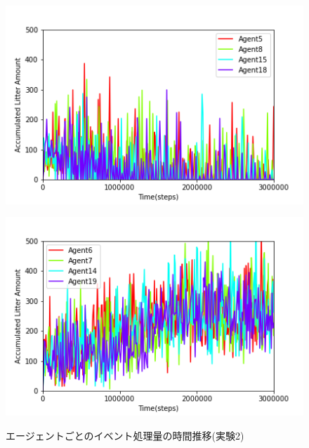 \documentclass[12pt,a4j,twoside]{jarticle}
\begin{document}
\begin{figure}[t]
      \begin{minipage}[t]{0.48\columnwidth}
        \centering
        \includegraphics[keepaspectratio, width=\linewidth]{figures/al_graph_ER_Complex_top.png}\\
        \label{fig:al_ER_Complex_top}
      \end{minipage}
    \hfill
      \begin{minipage}[t]{0.48\columnwidth}
        \centering
        \includegraphics[keepaspectratio, width=\linewidth]{figures/al_graph_ER_Complex_worst.png}\\
        \label{fig:al_ER_Complex_least}
      \end{minipage}
      \caption{エージェントごとのイベント処理量の時間推移(実験2)}
      \label{fig:al_ER_Complex}
    \end{figure}
\end{document}
